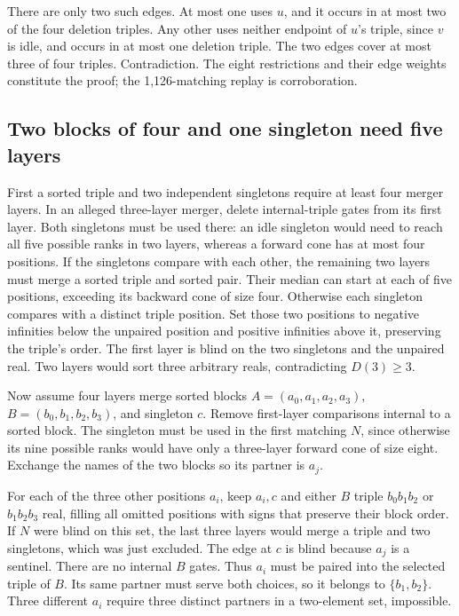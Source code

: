 \documentclass[11pt]{article}
\begin{document}
There are only two such edges. At most one uses $u$, and it occurs in at most two of the four deletion triples. Any other uses neither endpoint of $u$'s triple, since $v$ is idle, and occurs in at most one deletion triple. The two edges cover at most three of four triples. Contradiction. The eight restrictions and their edge weights constitute the proof; the 1,126-matching replay is corroboration.

\subsection{Two blocks of four and one singleton need five layers}
First a sorted triple and two independent singletons require at least four merger layers. In an alleged three-layer merger, delete internal-triple gates from its first layer. Both singletons must be used there: an idle singleton would need to reach all five possible ranks in two layers, whereas a forward cone has at most four positions. If the singletons compare with each other, the remaining two layers must merge a sorted triple and sorted pair. Their median can start at each of five positions, exceeding its backward cone of size four. Otherwise each singleton compares with a distinct triple position. Set those two positions to negative infinities below the unpaired position and positive infinities above it, preserving the triple's order. The first layer is blind on the two singletons and the unpaired real. Two layers would sort three arbitrary reals, contradicting $D(3)\ge3$.

Now assume four layers merge sorted blocks $A=(a_0,a_1,a_2,a_3)$, $B=(b_0,b_1,b_2,b_3)$, and singleton $c$. Remove first-layer comparisons internal to a sorted block. The singleton must be used in the first matching $N$, since otherwise its nine possible ranks would have only a three-layer forward cone of size eight. Exchange the names of the two blocks so its partner is $a_j$.

For each of the three other positions $a_i$, keep $a_i,c$ and either $B$ triple $b_0b_1b_2$ or $b_1b_2b_3$ real, filling all omitted positions with signs that preserve their block order. If $N$ were blind on this set, the last three layers would merge a triple and two singletons, which was just excluded. The edge at $c$ is blind because $a_j$ is a sentinel. There are no internal $B$ gates. Thus $a_i$ must be paired into the selected triple of $B$. Its same partner must serve both choices, so it belongs to $\{b_1,b_2\}$. Three different $a_i$ require three distinct partners in a two-element set, impossible.
\end{document}
